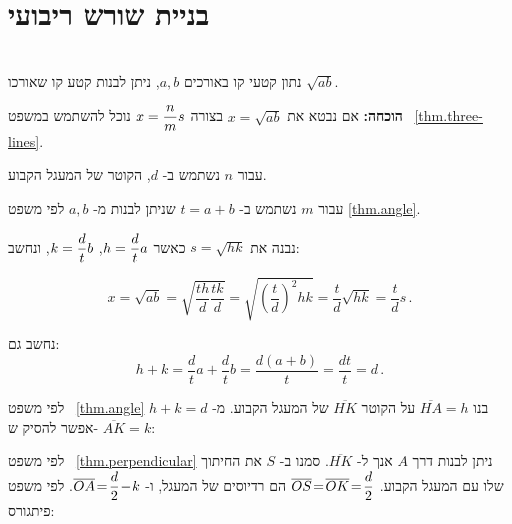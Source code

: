 
\section{בניית שורש ריבועי}\label{s.root}

\begin{theorem}\label{thm.root}\mbox{}\\
נתון קטעי קו באורכים
$a,b$,
ניתן לבנות קטע קו שאורכו
$\sqrt{ab}$.
\end{theorem}

\textbf{הוכחה:}
אם נבטא את
$x=\sqrt{ab}$
בצורה
$x=\displaystyle\frac{n}{m}s$
נוכל להשתמש במשפט~%
\ref{thm.three-lines}.

עבור
$n$
נשתמש ב-%
$d$,
הקוטר של המעגל הקבוע.

עבור
$m$
נשתמש ב-%
$t=a+b$
שניתן לבנות מ-%
$a,b$
לפי משפט
\ref{thm.angle}.

נבנה את
$s=\sqrt{hk}$
כאשר
$h=\displaystyle\frac{d}{t}a$, $k=\displaystyle\frac{d}{t}b$,
ונחשב:
%

\[
x=\sqrt{ab}=\sqrt{\frac{th}{d}\frac{tk}{d}}=\sqrt{\left(\frac{t}{d}\right)^2hk}=\frac{t}{d}\sqrt{hk}=\frac{t}{d}s\,.
\]
%

נחשב גם: 
\[
h+k = \frac{d}{t}a + \frac{d}{t}b = \frac{d(a+b)}{t} = \frac{dt}{t} = d\,.
\]


לפי משפט~%
\ref{thm.angle}
בנו
$\overline{HA}= h$
על הקוטר
$\overline{HK}$
של המעגל הקבוע. מ-%
$h+k=d$
אפשר להסיק ש-%
$\overline{AK}=k$:
\begin{center}

\vspace*{-4pt}
\end{center}
לפי משפט~%
\ref{thm.perpendicular}
ניתן לבנות דרך
$A$
אנך ל-%
$\overline{HK}$.
סמנו ב-%
$S$
את החיתוך שלו עם המעגל הקבוע.
$\overline{OS}\!=\!\overline{OK}\!=\!\displaystyle\frac{d}{2}$
הם רדיוסים של המעגל, ו-%
$\overline{OA}\!=\!\displaystyle\frac{d}{2}\!-\!k$.
לפי משפט פיתגורס:

